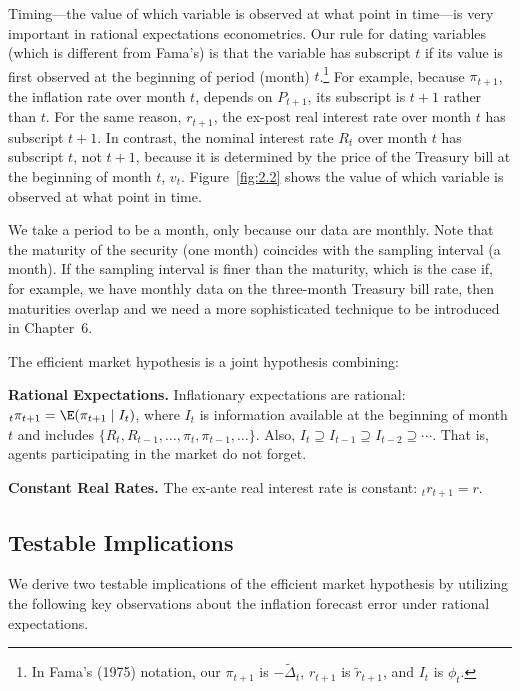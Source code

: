 Timing---the value of which variable is observed at what point in time---is very
important in rational expectations econometrics. Our rule for dating variables
(which is different from Fama's) is that the variable has subscript $t$ if its value
is first observed at the beginning of period (month) $t$.\footnote{In Fama's (1975)
notation, our $\pi_{t+1}$ is $-\widetilde{\Delta}_t$, $r_{t+1}$ is $\tilde{r}_{t+1}$,
and $I_t$ is $\phi_t$.}
For example, because $\pi_{t+1}$,
the inflation rate over month $t$, depends on $P_{t+1}$, its subscript is $t+1$ rather than $t$.
For the same reason, $r_{t+1}$, the ex-post real interest rate over month $t$ has subscript
$t + 1$. In contrast, the nominal interest rate $R_t$ over month $t$ has subscript $t$, not
$t + 1$, because it is determined by the price of the Treasury bill at the beginning of
month $t$, $v_t$. Figure~\ref{fig:2.2} shows the value of which variable is observed at what point
in time.

We take a period to be a month, only because our data are monthly. Note that
the maturity of the security (one month) coincides with the sampling interval (a
month). If the sampling interval is finer than the maturity, which is the case if,
for example, we have monthly data on the three-month Treasury bill rate, then
maturities overlap and we need a more sophisticated technique to be introduced in
Chapter~6.

The efficient market hypothesis is a joint hypothesis combining:

\medskip
\noindent\textbf{Rational Expectations.}\quad
Inflationary expectations are rational:
${}_t\pi_{t+1} = \E(\pi_{t+1} \mid I_t)$, where $I_t$ is information available at the beginning of month
$t$ and includes $\{R_t, R_{t-1}, \ldots, \pi_t, \pi_{t-1}, \ldots\}$.
Also, $I_t \supseteq I_{t-1} \supseteq I_{t-2} \supseteq \cdots$.
That is, agents participating in the market do not forget.

\medskip
\noindent\textbf{Constant Real Rates.}\quad
The ex-ante real interest rate is constant: ${}_tr_{t+1} = r$.

\subsection*{Testable Implications}

We derive two testable implications of the efficient market hypothesis by utilizing the following key observations about the inflation forecast error under rational
expectations.

